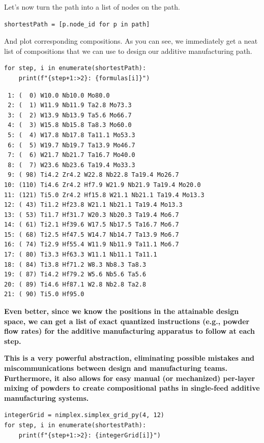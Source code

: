 Let's now turn the path into a list of nodes on the path.

\begin{verbatim}
shortestPath = [p.node_id for p in path]
\end{verbatim}

And plot corresponding compositions. As you can see, we immediately get
a neat list of compositions that we can use to design our additive
manufacturing path.

\begin{verbatim}
for step, i in enumerate(shortestPath):
    print(f"{step+1:>2}: {formulas[i]}")
\end{verbatim}

\begin{verbatim}
 1: (  0) W10.0 Nb10.0 Mo80.0 
 2: (  1) W11.9 Nb11.9 Ta2.8 Mo73.3 
 3: (  2) W13.9 Nb13.9 Ta5.6 Mo66.7 
 4: (  3) W15.8 Nb15.8 Ta8.3 Mo60.0 
 5: (  4) W17.8 Nb17.8 Ta11.1 Mo53.3 
 6: (  5) W19.7 Nb19.7 Ta13.9 Mo46.7 
 7: (  6) W21.7 Nb21.7 Ta16.7 Mo40.0 
 8: (  7) W23.6 Nb23.6 Ta19.4 Mo33.3 
 9: ( 98) Ti4.2 Zr4.2 W22.8 Nb22.8 Ta19.4 Mo26.7 
10: (110) Ti4.6 Zr4.2 Hf7.9 W21.9 Nb21.9 Ta19.4 Mo20.0 
11: (121) Ti5.0 Zr4.2 Hf15.8 W21.1 Nb21.1 Ta19.4 Mo13.3 
12: ( 43) Ti1.2 Hf23.8 W21.1 Nb21.1 Ta19.4 Mo13.3 
13: ( 53) Ti1.7 Hf31.7 W20.3 Nb20.3 Ta19.4 Mo6.7 
14: ( 61) Ti2.1 Hf39.6 W17.5 Nb17.5 Ta16.7 Mo6.7 
15: ( 68) Ti2.5 Hf47.5 W14.7 Nb14.7 Ta13.9 Mo6.7 
16: ( 74) Ti2.9 Hf55.4 W11.9 Nb11.9 Ta11.1 Mo6.7 
17: ( 80) Ti3.3 Hf63.3 W11.1 Nb11.1 Ta11.1 
18: ( 84) Ti3.8 Hf71.2 W8.3 Nb8.3 Ta8.3 
19: ( 87) Ti4.2 Hf79.2 W5.6 Nb5.6 Ta5.6 
20: ( 89) Ti4.6 Hf87.1 W2.8 Nb2.8 Ta2.8 
21: ( 90) Ti5.0 Hf95.0 
\end{verbatim}

\textbf{Even better, since we know the positions in the attainable
design space, we can get a list of exact quantized instructions (e.g.,
powder flow rates) for the additive manufacturing apparatus to follow at
each step.}

\textbf{This is a very powerful abstraction, eliminating possible
mistakes and miscommunications between design and manufacturing teams.
Furthermore, it also allows for easy manual (or mechanized) per-layer
mixing of powders to create compositional paths in single-feed additive
manufacturing systems.}

\begin{verbatim}
integerGrid = nimplex.simplex_grid_py(4, 12)
for step, i in enumerate(shortestPath):
    print(f"{step+1:>2}: {integerGrid[i]}")
\end{verbatim}

